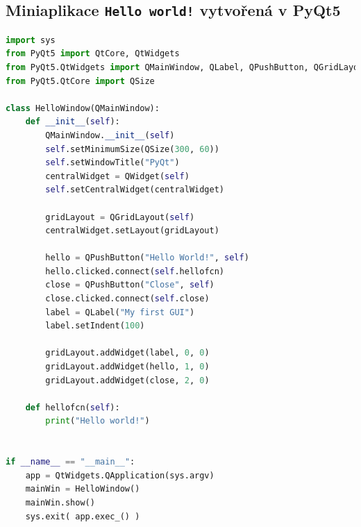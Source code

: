 \documentclass[a4paper, 12pt]{article}
\begin{document}
\subsection{Miniaplikace \texttt{Hello world!} vytvořená v PyQt5}
\begin{lstlisting}[language=Python]
import sys
from PyQt5 import QtCore, QtWidgets
from PyQt5.QtWidgets import QMainWindow, QLabel, QPushButton, QGridLayout, QWidget
from PyQt5.QtCore import QSize

class HelloWindow(QMainWindow):
    def __init__(self):
        QMainWindow.__init__(self)
        self.setMinimumSize(QSize(300, 60))
        self.setWindowTitle("PyQt")
        centralWidget = QWidget(self)
        self.setCentralWidget(centralWidget)

        gridLayout = QGridLayout(self)
        centralWidget.setLayout(gridLayout)

        hello = QPushButton("Hello World!", self)
        hello.clicked.connect(self.hellofcn)
        close = QPushButton("Close", self)
        close.clicked.connect(self.close)
        label = QLabel("My first GUI")
        label.setIndent(100)

        gridLayout.addWidget(label, 0, 0)
        gridLayout.addWidget(hello, 1, 0)
        gridLayout.addWidget(close, 2, 0)

    def hellofcn(self):
        print("Hello world!")


if __name__ == "__main__":
    app = QtWidgets.QApplication(sys.argv)
    mainWin = HelloWindow()
    mainWin.show()
    sys.exit( app.exec_() )
\end{lstlisting}
%
\end{document}
